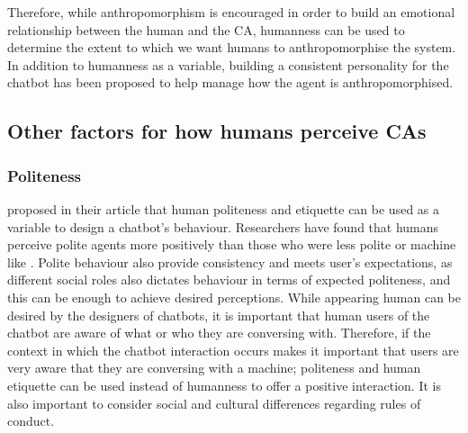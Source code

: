 Therefore, while anthropomorphism is encouraged in order to build an emotional relationship between the human and the CA, humanness can be used to determine the extent to which we want humans to anthropomorphise the system. In addition to humanness as a variable, building a consistent personality for the chatbot has been proposed to help manage how the agent is anthropomorphised.

\vspace{5mm}

\subsection{Other factors for how humans perceive CAs}
    \label{otherfactors}
\vspace{2.5mm}

\subsubsection{Politeness}
\cite{Meyer2016} proposed in their article that human politeness and etiquette can be used as a variable to design a chatbot’s behaviour. Researchers have found that humans perceive polite agents more positively than those who were less polite or machine like \citep{Inbar2015, Holtgraves2007}. Polite behaviour also provide consistency and meets user’s expectations, as different social roles also dictates behaviour in terms of expected politeness, and this can be enough to achieve desired perceptions. While appearing human can be desired by the designers of chatbots, it is important that human users of the chatbot are aware of what or who they are conversing with. Therefore, if the context in which the chatbot interaction occurs makes it important that users are very aware that they are conversing with a machine; politeness and human etiquette can be used instead of humanness to offer a positive interaction. It is also important to consider social and cultural differences regarding rules of conduct.



